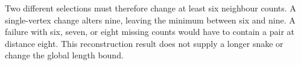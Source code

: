 Two different selections must therefore change at least six neighbour
counts. A single-vertex change alters nine, leaving the minimum between
six and nine. A failure with six, seven, or eight missing counts would
have to contain a pair at distance eight. This reconstruction result
does not supply a longer snake or change the global length bound.
